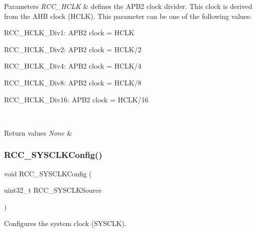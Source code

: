 \begin{DoxyParams}{Parameters}
{\em R\+C\+C\+\_\+\+H\+C\+LK} & defines the A\+P\+B2 clock divider. This clock is derived from the A\+HB clock (H\+C\+LK). This parameter can be one of the following values\+: \begin{DoxyItemize}
\item R\+C\+C\+\_\+\+H\+C\+L\+K\+\_\+\+Div1\+: A\+P\+B2 clock = H\+C\+LK \item R\+C\+C\+\_\+\+H\+C\+L\+K\+\_\+\+Div2\+: A\+P\+B2 clock = H\+C\+L\+K/2 \item R\+C\+C\+\_\+\+H\+C\+L\+K\+\_\+\+Div4\+: A\+P\+B2 clock = H\+C\+L\+K/4 \item R\+C\+C\+\_\+\+H\+C\+L\+K\+\_\+\+Div8\+: A\+P\+B2 clock = H\+C\+L\+K/8 \item R\+C\+C\+\_\+\+H\+C\+L\+K\+\_\+\+Div16\+: A\+P\+B2 clock = H\+C\+L\+K/16 \end{DoxyItemize}
\\
\hline
\end{DoxyParams}

\begin{DoxyRetVals}{Return values}
{\em None} & \\
\hline
\end{DoxyRetVals}
\mbox{\label{group___r_c_c___group2_ga3551a36a8f0a3dc96a74d6b939048337}} 
\subsubsection{\texorpdfstring{R\+C\+C\+\_\+\+S\+Y\+S\+C\+L\+K\+Config()}{RCC\_SYSCLKConfig()}}
{\footnotesize\ttfamily void R\+C\+C\+\_\+\+S\+Y\+S\+C\+L\+K\+Config (\begin{DoxyParamCaption}\item[{uint32\+\_\+t}]{R\+C\+C\+\_\+\+S\+Y\+S\+C\+L\+K\+Source }\end{DoxyParamCaption})}



Configures the system clock (S\+Y\+S\+C\+LK). 

